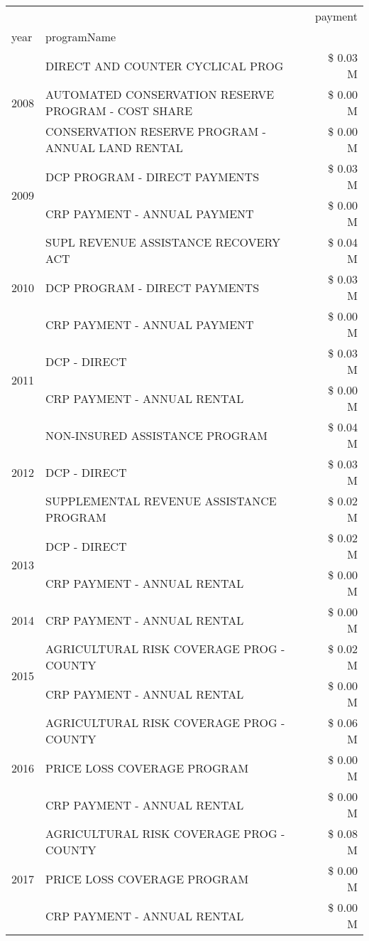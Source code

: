 \begin{tabular}{llr}
\toprule
 &  & payment \\
year & programName &  \\
\midrule
\multirow[t]{3}{*}{2008} & DIRECT AND COUNTER CYCLICAL PROG & \$ 0.03 M \\
 & AUTOMATED CONSERVATION RESERVE PROGRAM - COST SHARE & \$ 0.00 M \\
 & CONSERVATION RESERVE PROGRAM - ANNUAL LAND RENTAL & \$ 0.00 M \\
\cline{1-3}
\multirow[t]{2}{*}{2009} & DCP PROGRAM - DIRECT PAYMENTS & \$ 0.03 M \\
 & CRP PAYMENT - ANNUAL PAYMENT & \$ 0.00 M \\
\cline{1-3}
\multirow[t]{3}{*}{2010} & SUPL REVENUE ASSISTANCE RECOVERY ACT & \$ 0.04 M \\
 & DCP PROGRAM - DIRECT PAYMENTS & \$ 0.03 M \\
 & CRP PAYMENT - ANNUAL PAYMENT & \$ 0.00 M \\
\cline{1-3}
\multirow[t]{2}{*}{2011} & DCP - DIRECT & \$ 0.03 M \\
 & CRP PAYMENT - ANNUAL RENTAL & \$ 0.00 M \\
\cline{1-3}
\multirow[t]{3}{*}{2012} & NON-INSURED ASSISTANCE PROGRAM & \$ 0.04 M \\
 & DCP - DIRECT & \$ 0.03 M \\
 & SUPPLEMENTAL REVENUE ASSISTANCE PROGRAM & \$ 0.02 M \\
\cline{1-3}
\multirow[t]{2}{*}{2013} & DCP - DIRECT & \$ 0.02 M \\
 & CRP PAYMENT - ANNUAL RENTAL & \$ 0.00 M \\
\cline{1-3}
2014 & CRP PAYMENT - ANNUAL RENTAL & \$ 0.00 M \\
\cline{1-3}
\multirow[t]{2}{*}{2015} & AGRICULTURAL RISK COVERAGE PROG - COUNTY & \$ 0.02 M \\
 & CRP PAYMENT - ANNUAL RENTAL & \$ 0.00 M \\
\cline{1-3}
\multirow[t]{3}{*}{2016} & AGRICULTURAL RISK COVERAGE PROG - COUNTY & \$ 0.06 M \\
 & PRICE LOSS COVERAGE PROGRAM & \$ 0.00 M \\
 & CRP PAYMENT - ANNUAL RENTAL & \$ 0.00 M \\
\cline{1-3}
\multirow[t]{3}{*}{2017} & AGRICULTURAL RISK COVERAGE PROG - COUNTY & \$ 0.08 M \\
 & PRICE LOSS COVERAGE PROGRAM & \$ 0.00 M \\
 & CRP PAYMENT - ANNUAL RENTAL & \$ 0.00 M \\

\end{tabular}
